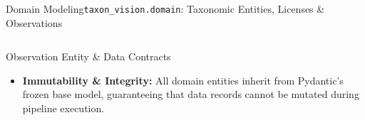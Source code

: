 \begin{frame}{Domain Modeling}{\texttt{taxon\_vision.domain}: Taxonomic Entities, Licenses \& Observations}
\begin{columns}[T]
\begin{column}{0.48\textwidth}
\begin{block}{Observation Entity \& Data Contracts}
\begin{itemize}
\begin{itemize}
                            \item \texttt{ObservationRecord}: Authoritative record definition:
                                \begin{itemize}\tiny
                                    \item \texttt{observation\_id: int}
                                    \item \texttt{taxon: TaxonNode}
                                    \item \texttt{image\_url: str}
                                    \item \texttt{attribution: AttributionRecord}
                                    \item \texttt{observed\_on: datetime}
                                \end{itemize}
                        \end{itemize}
                    \item \textbf{Immutability \& Integrity:}
                        All domain entities inherit from Pydantic's frozen base model, guaranteeing that data records cannot be mutated during pipeline execution.
                \end{itemize}
            \end{block}
        \end{column}
    \end{columns}


\end{frame}

